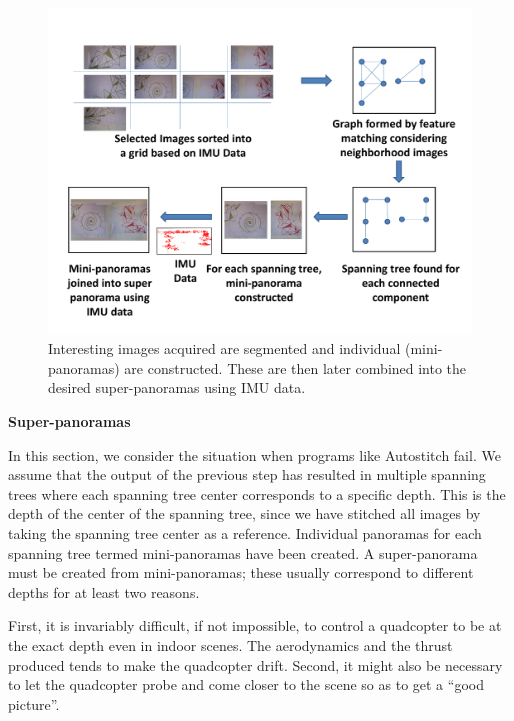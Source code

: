 \documentclass[11pt]{article}
\begin{document}
\begin{figure}[h!]
  \centering
  \includegraphics[width=\textwidth]{mosaicing/figures/graphCreation} 
  \caption{ \label{fig:graph} Interesting images acquired are
    segmented and individual (mini-panoramas) are constructed. These
    are then later combined into the desired super-panoramas using IMU data.}
\end{figure}    

\noindent\textbf{Super-panoramas}
  
In this section, we consider the situation when programs like
Autostitch fail.  We assume that the output of the previous step has
resulted in multiple spanning trees where each spanning tree center
corresponds to a specific depth. This is the depth of the center of
the spanning tree, since we have stitched all images by taking the
spanning tree center as a reference.  Individual panoramas for each
spanning tree termed mini-panoramas have been created. A
super-panorama must be created from mini-panoramas; these usually
correspond to different depths for at least two reasons.

First, it is invariably difficult, if not impossible, to control a
quadcopter to be at the exact depth even in indoor scenes.  The
aerodynamics and the thrust produced tends to make the quadcopter
drift.  Second, it might also be necessary to let the quadcopter probe
and come closer to the scene so as to get a ``good picture''.
\end{document}
